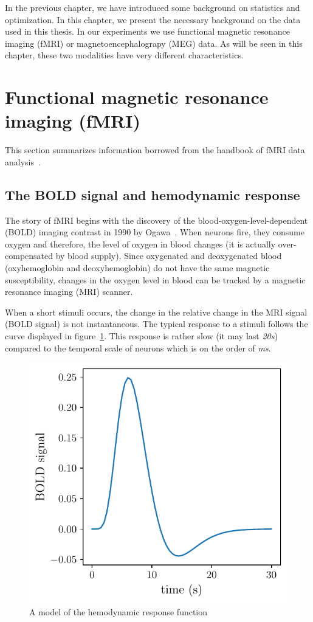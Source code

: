 In the previous chapter, we have introduced some background on statistics and
optimization.
In this chapter, we present the necessary background on the data used in this
thesis.
In our experiments we use functional magnetic resonance imaging (fMRI) or
magnetoencephalograpy (MEG) data. As will be seen in this chapter, these two modalities have very different
characteristics.

\section{Functional magnetic resonance imaging (fMRI)}
This section summarizes information borrowed from the handbook of fMRI data analysis~\cite{poldrack2011handbook}.

\subsection{The BOLD signal and hemodynamic response}
The story of fMRI begins with the discovery of the blood-oxygen-level-dependent
(BOLD) imaging contrast in 1990 by Ogawa~\cite{ogawa1990brain}. When neurons
fire, they consume oxygen and therefore, the level of oxygen in blood changes (it is actually over-compensated by blood supply).
Since oxygenated and deoxygenated blood (oxyhemoglobin
and deoxyhemoglobin) do not have the same magnetic susceptibility, changes in
the oxygen level in blood can be tracked by a magnetic resonance imaging (MRI) scanner.

When a short stimuli occurs, the change in the relative change in the MRI signal (BOLD
signal) is not instantaneous. The typical response to a stimuli follows the
curve displayed in figure~\ref{fig:hrf}. This response is rather slow (it may last \emph{20s}) compared to the temporal scale of neurons which is on the order of \emph{ms}.

\begin{figure}
  \center
  \includegraphics[scale=0.8]{figures/neuroscience/hrf.pdf}
  \caption{A model of the hemodynamic response function}
  \label{fig:hrf}
\end{figure}

